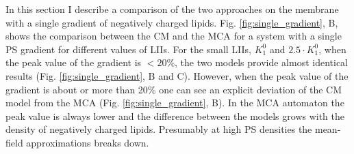In this section I describe a comparison of the two approaches on the membrane with a single gradient of negatively charged lipids. Fig. \ref{fig:single_gradient}, B, shows the comparison between the CM and the MCA for a system with a single PS gradient for different values of LIIs. For the small LIIs, $K_1^0$ and $2.5\cdot K_1^0$, when the peak value of the gradient is $<20$\%, the two models provide almost identical results (Fig. \ref{fig:single_gradient}, B and C). However, when the peak value of the gradient is about or more than 20\% one can see an explicit deviation of the CM model from the MCA (Fig. \ref{fig:single_gradient}, B). In the MCA automaton the peak value is always lower and the difference between the models grows with the density of negatively charged lipids. Presumably at high PS densities the mean-field approximations breaks down.
\begin{figure}[!ht]
\centering

\end{figure}
